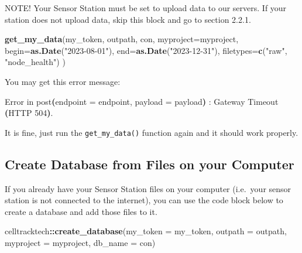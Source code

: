 \documentclass[
]{book}
\newenvironment{Shaded}{\begin{snugshade}}{\end{snugshade}}
\newcommand{\AttributeTok}[1]{\textcolor[rgb]{0.13,0.29,0.53}{#1}}
\newcommand{\BuiltInTok}[1]{#1}
\newcommand{\ErrorTok}[1]{\textcolor[rgb]{0.64,0.00,0.00}{\textbf{#1}}}
\newcommand{\ExtensionTok}[1]{#1}
\newcommand{\FunctionTok}[1]{\textcolor[rgb]{0.13,0.29,0.53}{\textbf{#1}}}
\newcommand{\KeywordTok}[1]{\textcolor[rgb]{0.13,0.29,0.53}{\textbf{#1}}}
\newcommand{\NormalTok}[1]{#1}
\newcommand{\SpecialCharTok}[1]{\textcolor[rgb]{0.81,0.36,0.00}{\textbf{#1}}}
\newcommand{\StringTok}[1]{\textcolor[rgb]{0.31,0.60,0.02}{#1}}
\begin{document}
NOTE! Your Sensor Station must be set to upload data to our servers. If your station does not upload data, skip this block and go to section 2.2.1.

\begin{Shaded}
\begin{Highlighting}[]
\FunctionTok{get\_my\_data}\NormalTok{(my\_token,}
\NormalTok{            outpath, }
\NormalTok{            con, }
            \AttributeTok{myproject=}\NormalTok{myproject,}
            \AttributeTok{begin=}\FunctionTok{as.Date}\NormalTok{(}\StringTok{"2023{-}08{-}01"}\NormalTok{),}
            \AttributeTok{end=}\FunctionTok{as.Date}\NormalTok{(}\StringTok{"2023{-}12{-}31"}\NormalTok{),}
            \AttributeTok{filetypes=}\FunctionTok{c}\NormalTok{(}\StringTok{"raw"}\NormalTok{, }\StringTok{"node\_health"}\NormalTok{)}
\NormalTok{)}
\end{Highlighting}
\end{Shaded}

You may get this error message:

\begin{Shaded}
\begin{Highlighting}[]
\ExtensionTok{Error}\NormalTok{ in post}\ErrorTok{(}\ExtensionTok{endpoint}\NormalTok{ = endpoint, payload = payload}\KeywordTok{)} \BuiltInTok{:} 
  \ExtensionTok{Gateway}\NormalTok{ Timeout }\ErrorTok{(}\ExtensionTok{HTTP}\NormalTok{ 504}\KeywordTok{)}\BuiltInTok{.}
\end{Highlighting}
\end{Shaded}

It is fine, just run the \texttt{get\_my\_data()} function again and it should work properly.

\subsection{Create Database from Files on your Computer}\label{create-database-from-files-on-your-computer}

If you already have your Sensor Station files on your computer (i.e.~your sensor station is not connected to the internet), you can use the code block below to create a database and add those files to it.

\begin{Shaded}
\begin{Highlighting}[]
\NormalTok{celltracktech}\SpecialCharTok{::}\FunctionTok{create\_database}\NormalTok{(}\AttributeTok{my\_token =}\NormalTok{ my\_token,}
                               \AttributeTok{outpath =}\NormalTok{ outpath,}
                               \AttributeTok{myproject =}\NormalTok{ myproject,}
                               \AttributeTok{db\_name =}\NormalTok{ con)}
\end{Highlighting}
\end{Shaded}
\end{document}
